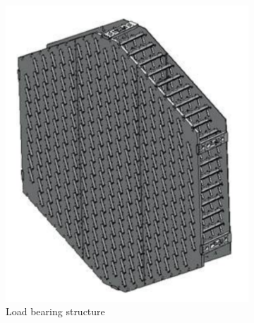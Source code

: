 \documentclass[main.tex]{subfiles}
\begin{document}
\begin{figure}[h]
  \begin{subfigure}{0.31\textwidth}
    \includegraphics[width=\linewidth]{Pictures/loadbearingstructure.pdf}
    \caption{Load bearing structure} \label{fig:1a}
  \end{subfigure}%
  \hspace*{\fill}   %
  \begin{subfigure}{0.31\textwidth}

\end{subfigure}
\end{figure}
\end{document}
